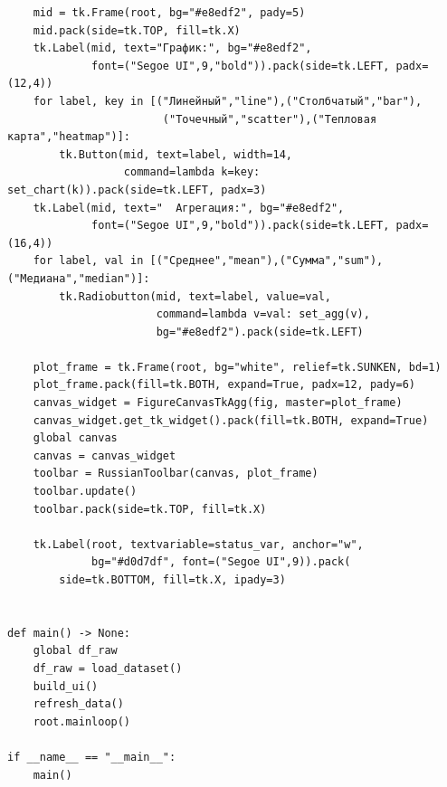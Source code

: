 \documentclass[oneside,a4paper,14pt]{extarticle}
\begin{document}
\begin{verbatim}
    mid = tk.Frame(root, bg="#e8edf2", pady=5)
    mid.pack(side=tk.TOP, fill=tk.X)
    tk.Label(mid, text="График:", bg="#e8edf2",
             font=("Segoe UI",9,"bold")).pack(side=tk.LEFT, padx=(12,4))
    for label, key in [("Линейный","line"),("Столбчатый","bar"),
                        ("Точечный","scatter"),("Тепловая карта","heatmap")]:
        tk.Button(mid, text=label, width=14,
                  command=lambda k=key: set_chart(k)).pack(side=tk.LEFT, padx=3)
    tk.Label(mid, text="  Агрегация:", bg="#e8edf2",
             font=("Segoe UI",9,"bold")).pack(side=tk.LEFT, padx=(16,4))
    for label, val in [("Среднее","mean"),("Сумма","sum"),("Медиана","median")]:
        tk.Radiobutton(mid, text=label, value=val,
                       command=lambda v=val: set_agg(v),
                       bg="#e8edf2").pack(side=tk.LEFT)

    plot_frame = tk.Frame(root, bg="white", relief=tk.SUNKEN, bd=1)
    plot_frame.pack(fill=tk.BOTH, expand=True, padx=12, pady=6)
    canvas_widget = FigureCanvasTkAgg(fig, master=plot_frame)
    canvas_widget.get_tk_widget().pack(fill=tk.BOTH, expand=True)
    global canvas
    canvas = canvas_widget
    toolbar = RussianToolbar(canvas, plot_frame)
    toolbar.update()
    toolbar.pack(side=tk.TOP, fill=tk.X)

    tk.Label(root, textvariable=status_var, anchor="w",
             bg="#d0d7df", font=("Segoe UI",9)).pack(
        side=tk.BOTTOM, fill=tk.X, ipady=3)


def main() -> None:
    global df_raw
    df_raw = load_dataset()
    build_ui()
    refresh_data()
    root.mainloop()

if __name__ == "__main__":
    main()
\end{verbatim}
\end{document}
